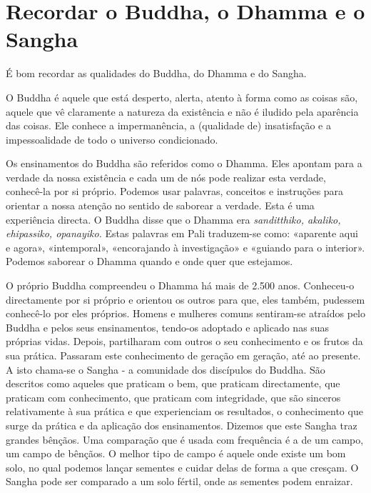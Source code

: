 \chapter{Recordar o Buddha, o Dhamma e o Sangha}

É bom recordar as qualidades do Buddha, do Dhamma e do Sangha.

O Buddha é aquele que está desperto, alerta, atento à forma como as
coisas são, aquele que vê claramente a natureza da existência e não é
iludido pela aparência das coisas. Ele conhece a impermanência, a
(qualidade de) insatisfação e a impessoalidade de todo o universo
condicionado.

Os ensinamentos do Buddha são referidos como o Dhamma. Eles apontam para
a verdade da nossa existência e cada um de nós pode realizar esta
verdade, conhecê-la por si próprio. Podemos usar palavras, conceitos e
instruções para orientar a nossa atenção no sentido de saborear a
verdade. Esta é uma experiência directa. O Buddha disse que o Dhamma era
\emph{sanditthiko, akaliko, ehipassiko, opanayiko.} Estas palavras em
Pali traduzem-se como: «aparente aqui e agora», «intemporal»,
«encorajando à investigação» e «guiando para o interior». Podemos
saborear o Dhamma quando e onde quer que estejamos.

O próprio Buddha compreendeu o Dhamma há mais de 2.500 anos. Conheceu-o
directamente por si próprio e orientou os outros para que, eles também,
pudessem conhecê-lo por eles próprios. Homens e mulheres comuns
sentiram-se atraídos pelo Buddha e pelos seus ensinamentos, tendo-os
adoptado e aplicado nas suas próprias vidas. Depois, partilharam com
outros o seu conhecimento e os frutos da sua prática. Passaram este
conhecimento de geração em geração, até ao presente. A isto chama-se o
Sangha - a comunidade dos discípulos do Buddha. São descritos como
aqueles que praticam o bem, que praticam directamente, que praticam com
conhecimento, que praticam com integridade, que são sinceros
relativamente à sua prática e que experienciam os resultados, o
conhecimento que surge da prática e da aplicação dos ensinamentos.
Dizemos que este Sangha traz grandes bênçãos. Uma comparação que é usada
com frequência é a de um campo, um campo de bênçãos. O melhor tipo de
campo é aquele onde existe um bom solo, no qual podemos lançar sementes
e cuidar delas de forma a que cresçam. O Sangha pode ser comparado a um
solo fértil, onde as sementes podem enraizar.

